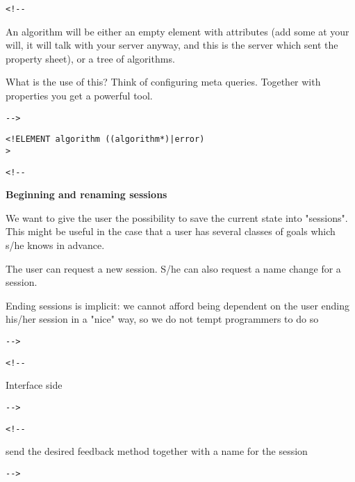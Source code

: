 \begin{verbatim}<!--\end{verbatim}
  

     An algorithm will be either an empty element with 
     attributes (add some at your will, it will talk with your 
     server anyway, and this is the server which sent the property 
     sheet), or a tree of algorithms.

     What is the use of this?
     Think of configuring meta queries. Together with properties
     you get a powerful tool.

       
 \begin{verbatim}-->\end{verbatim}



\begin{verbatim}
<!ELEMENT algorithm ((algorithm*)|error) 
>\end{verbatim}

\begin{verbatim}<!--\end{verbatim}
  

     \textbf{Beginning and renaming sessions}

     We want to give the user the possibility to save the current
     state into "sessions". This might be useful in the case that 
     a user has several classes of goals which s/he knows in advance.

     The user can request a new session.
     S/he can also request a name change for a session.
     
     Ending sessions is implicit:
     we cannot afford being dependent on the user ending
     his/her session in a "nice" way, so we do not 
     tempt programmers to do so 

       
 \begin{verbatim}-->\end{verbatim}



\begin{verbatim}<!--\end{verbatim}
  Interface side  
 \begin{verbatim}-->\end{verbatim}



\begin{verbatim}<!--\end{verbatim}
  send the desired feedback method together with 
       a name for the session  
 \begin{verbatim}-->\end{verbatim}



